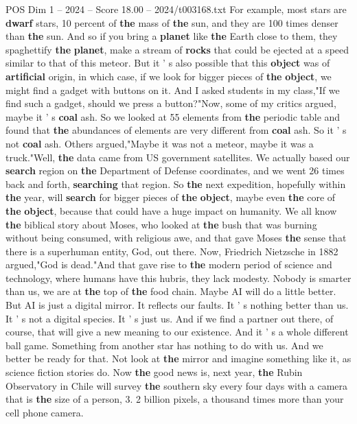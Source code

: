 \begin{textsample}{POS Dim 1 – 2024 – Score 18.00 – 2024/t003168.txt}
For example, most stars are \textbf{dwarf} stars, 10 percent of \textbf{the} mass of \textbf{the} sun, and they are 100 times denser than \textbf{the} sun.
And so if you bring a \textbf{planet} like \textbf{the} Earth close to them, they spaghettify \textbf{the} \textbf{planet}, make a stream of \textbf{rocks} that could be ejected at a speed similar to that of this meteor.
But it ' s also possible that this \textbf{object} was of \textbf{artificial} origin, in which case, if we look for bigger pieces of \textbf{the} \textbf{object}, we might find a gadget with buttons on it.
And I asked students in my class,"If we find such a gadget, should we press a button?"Now, some of my critics argued, maybe it ' s \textbf{coal} ash.
So we looked at 55 elements from \textbf{the} periodic table and found that \textbf{the} abundances of elements are very different from \textbf{coal} ash.
So it ' s not \textbf{coal} ash.
Others argued,"Maybe it was not a meteor, maybe it was a truck."Well, \textbf{the} data came from US government satellites.
We actually based our \textbf{search} region on \textbf{the} Department of Defense coordinates, and we went 26 times back and forth, \textbf{searching} that region.
So \textbf{the} next expedition, hopefully within \textbf{the} year, will \textbf{search} for bigger pieces of \textbf{the} \textbf{object}, maybe even \textbf{the} core of \textbf{the} \textbf{object}, because that could have a huge impact on humanity.
We all know \textbf{the} biblical story about Moses, who looked at \textbf{the} bush that was burning without being consumed, with religious awe, and that gave Moses \textbf{the} sense that there is a superhuman entity, God, out there.
Now, Friedrich Nietzsche in 1882 argued,"God is dead."And that gave rise to \textbf{the} modern period of science and technology, where humans have this hubris, they lack modesty.
Nobody is smarter than us, we are at \textbf{the} top of \textbf{the} food chain.
Maybe AI will do a little better.
But AI is just a digital mirror.
It reflects our faults.
It ' s nothing better than us.
It ' s not a digital species.
It ' s just us.
And if we find a partner out there, of course, that will give a new meaning to our existence.
And it ' s a whole different ball game.
Something from another star has nothing to do with us.
And we better be ready for that.
Not look at \textbf{the} mirror and imagine something like it, as science fiction stories do.
Now \textbf{the} good news is, next year, \textbf{the} Rubin Observatory in Chile will survey \textbf{the} southern sky every four days with a camera that is \textbf{the} size of a person, 3. 2 billion pixels, a thousand times more than your cell phone camera.

\end{textsample}
